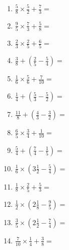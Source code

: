 \documentclass[12pt]{article}
\begin{document}
\begin{enumerate}[ itemsep=1.5cm]
	\item $\displaystyle \frac{5}{8} \times \frac{5}{2} + \frac{7}{3} =$
	\item $\displaystyle \frac{9}{5} \times \frac{7}{3} + \frac{5}{8} =$
	\item $\displaystyle \frac{2}{3} \times \frac{2}{5} + \frac{6}{5} =$
	\item $\displaystyle \frac{3}{8} + \left( \frac{2}{5} - \frac{5}{4} \right) =$
	\item $\displaystyle \frac{1}{6} \times \frac{5}{6} + \frac{7}{10} =$
	\item $\displaystyle \frac{1}{4} + \left( \frac{5}{3} - \frac{5}{2} \right) =$
	\item $\displaystyle \frac{11}{8} + \left( \frac{4}{3} - \frac{3}{2} \right) =$
	\item $\displaystyle \frac{6}{5} \times \frac{3}{4} + \frac{1}{10} =$
	\item $\displaystyle \frac{5}{4} + \left( \frac{7}{4} - \frac{1}{5} \right) =$

	\item $\displaystyle \frac{1}{6} \times \left( 3 \frac{1}{2} - \frac{5}{4} \right) =$
	\item $\displaystyle \frac{1}{8} \times \frac{2}{5} + \frac{5}{3} =$
	\item $\displaystyle \frac{1}{2} \times \left( 2 \frac{1}{8} - \frac{9}{5} \right) =$
	\item $\displaystyle \frac{3}{5} \times \left( 2 \frac{1}{2} - \frac{7}{4} \right) =$
	\item $\displaystyle \frac{7}{10} \times \frac{1}{4} + \frac{3}{8} =$
\end{enumerate}
\end{document}

